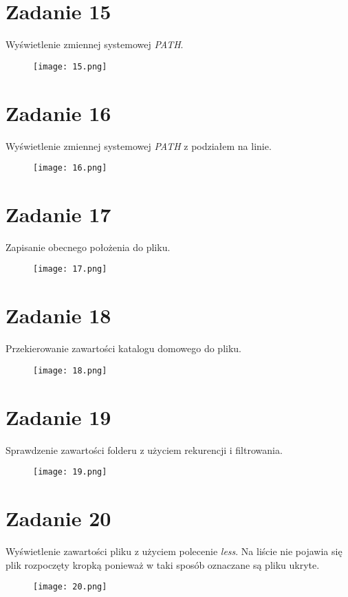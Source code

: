 \documentclass[fleqn,onecolumn,a4paper,12pt,titlepage]{article}
\begin{document}
\section*{Zadanie 15}
Wyświetlenie zmiennej systemowej \textit{PATH}.
\begin{figure}[H]%
    \centering\texttt{[image: 15.png]}
\end{figure}

\section*{Zadanie 16}
Wyświetlenie zmiennej systemowej \textit{PATH} z podziałem na linie.
\begin{figure}[H]%
    \centering\texttt{[image: 16.png]}
\end{figure}

\section*{Zadanie 17}
Zapisanie obecnego położenia do pliku.
\begin{figure}[H]%
    \centering\texttt{[image: 17.png]}
\end{figure}

\section*{Zadanie 18}
Przekierowanie zawartości katalogu domowego do pliku.
\begin{figure}[H]%
    \centering\texttt{[image: 18.png]}
\end{figure}

\section*{Zadanie 19}
Sprawdzenie zawartości folderu z użyciem rekurencji i filtrowania.
\begin{figure}[H]%
    \centering\texttt{[image: 19.png]}
\end{figure}

\section*{Zadanie 20}
Wyświetlenie zawartości pliku z użyciem polecenie \textit{less}.
Na liście nie pojawia się plik rozpoczęty kropką ponieważ w taki sposób oznaczane są pliku ukryte.
\begin{figure}[H]%
    \centering\texttt{[image: 20.png]}
\end{figure}
\end{document}
